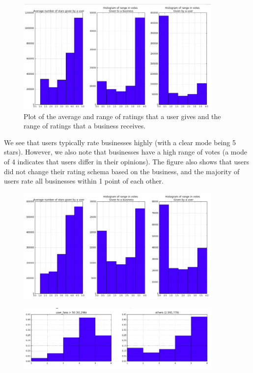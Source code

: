 \documentclass[11pt]{article}
\begin{document}
\begin{figure}[H]
\centering
\includegraphics[width=0.9\textwidth]{./ac209/avgstarsusersbusinesses.png}
\caption{Plot of the average and range of ratings that a user gives and the range of ratings that a business receives.}
\end{figure}

\par We see that users typically rate businesses highly (with a clear mode being 5 stars). However, we also note that businesses have a high range of votes (a mode of 4 indicates that users differ in their opinions). The figure also shows that users did not change their rating schema based on the business, and the majority of users rate all businesses within 1 point of each other.


\begin{figure}[H]
\centering
\includegraphics[width=0.9\textwidth]{./ac209/avgstarsusersbusinesses-filter.png}
\caption{}
\end{figure}




\begin{figure}[H]
\centering
\includegraphics[width=0.9\textwidth]{./ac209/lotsoffans.png}
\end{figure}
\end{document}
